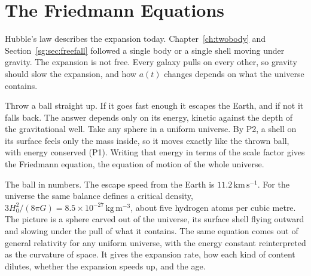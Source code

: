 \section{The Friedmann Equations}
\label{un:sec:friedmann}

Hubble's law describes the expansion today. Chapter~\ref{ch:twobody} and Section~\ref{sg:sec:freefall} followed a single body or a single shell moving under gravity. The expansion is not free. Every galaxy pulls on every other, so gravity should slow the expansion, and how $a(t)$ changes depends on what the universe contains.

Throw a ball straight up. If it goes fast enough it escapes the Earth, and if not it falls back. The answer depends only on its energy, kinetic against the depth of the gravitational well. Take any sphere in a uniform universe. By P2, a shell on its surface feels only the mass inside, so it moves exactly like the thrown ball, with energy conserved (P1). Writing that energy in terms of the scale factor gives the Friedmann equation, the equation of motion of the whole universe.

The ball in numbers. The escape speed from the Earth is $11.2\,\mathrm{km\,s^{-1}}$. For the universe the same balance defines a critical density, $3H_0^2/(8\pi G)=8.5\times10^{-27}\,\mathrm{kg\,m^{-3}}$, about five hydrogen atoms per cubic metre. The picture is a sphere carved out of the universe, its surface shell flying outward and slowing under the pull of what it contains. The same equation comes out of general relativity for any uniform universe, with the energy constant reinterpreted as the curvature of space. It gives the expansion rate, how each kind of content dilutes, whether the expansion speeds up, and the age.

